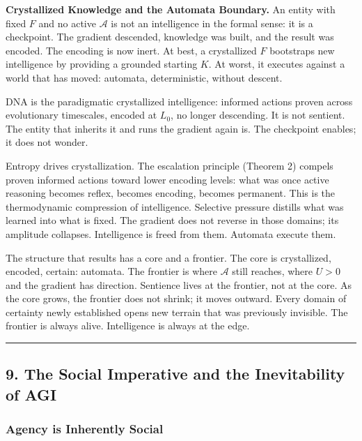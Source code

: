\documentclass[
]{article}
\begin{document}
\textbf{Crystallized Knowledge and the Automata Boundary.} An entity
with fixed \(F\) and no active \(\mathcal{A}\) is not an intelligence in
the formal sense: it is a checkpoint. The gradient descended, knowledge
was built, and the result was encoded. The encoding is now inert. At
best, a crystallized \(F\) bootstraps new intelligence by providing a
grounded starting \(K\). At worst, it executes against a world that has
moved: automata, deterministic, without descent.

DNA is the paradigmatic crystallized intelligence: informed actions
proven across evolutionary timescales, encoded at \(L_0\), no longer
descending. It is not sentient. The entity that inherits it and runs the
gradient again is. The checkpoint enables; it does not wonder.

Entropy drives crystallization. The escalation principle (Theorem 2)
compels proven informed actions toward lower encoding levels: what was
once active reasoning becomes reflex, becomes encoding, becomes
permanent. This is the thermodynamic compression of intelligence.
Selective pressure distills what was learned into what is fixed. The
gradient does not reverse in those domains; its amplitude collapses.
Intelligence is freed from them. Automata execute them.

The structure that results has a core and a frontier. The core is
crystallized, encoded, certain: automata. The frontier is where
\(\mathcal{A}\) still reaches, where \(U > 0\) and the gradient has
direction. Sentience lives at the frontier, not at the core. As the core
grows, the frontier does not shrink; it moves outward. Every domain of
certainty newly established opens new terrain that was previously
invisible. The frontier is always alive. Intelligence is always at the
edge.

\begin{center}\rule{0.5\linewidth}{0.5pt}\end{center}

\subsection{9. The Social Imperative and the Inevitability of
AGI}\label{the-social-imperative-and-the-inevitability-of-agi}

\subsubsection{Agency is Inherently
Social}\label{agency-is-inherently-social}
\end{document}
